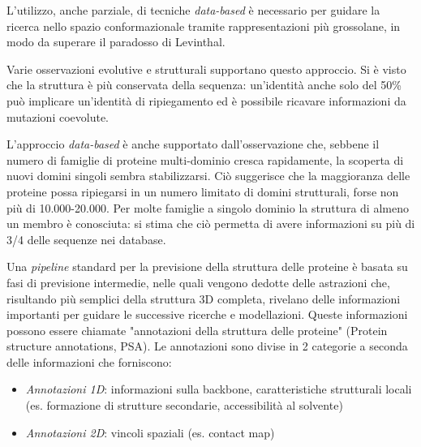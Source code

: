 {\par L'utilizzo, anche parziale, di tecniche \textit{data-based} è necessario per guidare la ricerca nello spazio conformazionale tramite rappresentazioni più grossolane, in modo da superare il paradosso di Levinthal.

\par Varie osservazioni evolutive e strutturali supportano questo approccio. Si è visto che la struttura è più conservata della sequenza: un'identità anche solo del 50\% può implicare un'identità di ripiegamento ed è possibile ricavare informazioni da mutazioni coevolute.

\par L'approccio \textit{data-based} è anche supportato dall'osservazione che, sebbene il numero di famiglie di proteine multi-dominio cresca rapidamente, la scoperta di nuovi domini singoli sembra stabilizzarsi. Ciò suggerisce che la maggioranza delle proteine possa ripiegarsi in un numero limitato di domini strutturali, forse non più di 10.000-20.000. Per molte famiglie a singolo dominio la struttura di almeno un membro è conosciuta: si stima che ciò permetta di avere informazioni su più di 3/4 delle sequenze nei database\supercite{alberts2018essential}. \\

\par Una \textit{pipeline} standard per la previsione della struttura delle proteine è basata su fasi di previsione intermedie, nelle quali vengono dedotte delle astrazioni che, risultando più semplici della struttura 3D completa, rivelano delle informazioni importanti per guidare le successive ricerche e modellazioni. Queste informazioni possono essere chiamate "annotazioni della struttura delle proteine" (Protein structure annotations, PSA). Le annotazioni sono divise in 2 categorie a seconda delle informazioni che forniscono:
\begin{itemize}
	\item \textit{Annotazioni 1D}: informazioni sulla backbone, caratteristiche strutturali locali (es. formazione di strutture secondarie, accessibilità al solvente)
	\item \textit{Annotazioni 2D}: vincoli spaziali (es. contact map)
\end{itemize}

}

